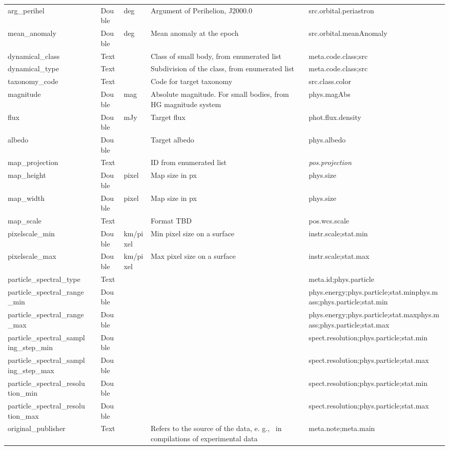 \documentclass[11pt,a4paper]{ivoa}
\begin{document}
\begin{longtable}{p{3.5cm}p{0.5cm}p{1cm}p{1cm}p{7cm}p{3cm}}
arg\_perihel&&Double&deg&Argument of Perihelion, J2000.0&src.orbital.periastron\\
mean\_anomaly&&Double&deg&Mean anomaly at the epoch&src.orbital.meanAnomaly\\
dynamical\_class&&Text&&Class of small body, from enumerated list&meta.code.class;src\\
dynamical\_type&&Text&&Subdivision of the class, from enumerated list&meta.code.class;src\\
taxonomy\_code&&Text&&Code for target taxonomy&src.class.color\\
magnitude&&Double&mag&Absolute magnitude. For small bodies, from HG magnitude system&phys.magAbs\\
flux&&Double&mJy&Target flux&phot.flux.density\\
albedo&&Double&&Target albedo&phys.albedo\\
map\_projection&&Text&&ID from enumerated list&\emph{pos.projection}\\
map\_height&&Double&pixel&Map size in px&phys.size\\
map\_width&&Double&pixel&Map size in px&phys.size\\
map\_scale&&Text&&Format TBD&pos.wcs.scale\\
pixelscale\_min&&Double&km/pixel&Min pixel size on a surface&instr.scale;stat.min\\
pixelscale\_max&&Double&km/pixel&Max pixel size on a surface&instr.scale;stat.max\\
particle\_spectral\_type&&Text&&&meta.id;phys.particle\\
particle\_spectral\_range\_min&&Double&&&phys.energy;phys.particle;stat.minphys.mass;phys.particle;stat.min\\
particle\_spectral\_range\_max&&Double&&&phys.energy;phys.particle;stat.maxphys.mass;phys.particle;stat.max\\
particle\_spectral\_sampling\_step\_min&&Double&&&spect.resolution;phys.particle;stat.min \\
particle\_spectral\_sampling\_step\_max&&Double&&&spect.resolution;phys.particle;stat.max \\
particle\_spectral\_resolution\_min&&Double&&&spect.resolution;phys.particle;stat.min \\
particle\_spectral\_resolution\_max&&Double&&&spect.resolution;phys.particle;stat.max \\
original\_publisher&&Text&&Refers to the source of the data, e. g.,  in compilations of experimental data&meta.note;meta.main\\

\end{longtable}
\end{document}
